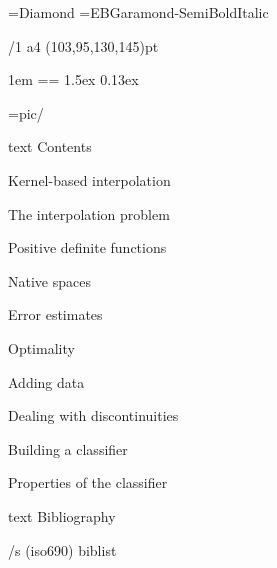 \useOpTeX  %


\hyperlinks \Black \Black
{}

\enlang
\fontfam[TypewriterMT]
\fontfam[BaskervilleMT]\let\semibold\relax \typosize[12.2/14.4]%



\font\symbols=Diamond %
\def\QED{\hbox{\symbols\resizethefont \,❖}}
\font\boldmathfont=EBGaramond-SemiBoldItalic
\famvardef\tt{\TypewriterMT{}\typoscale[870/]\rm}


\margins/1 a4 (103,95,130,145)pt


\parindent 1em
\iindent=\parindent \ttindent=\parindent
\parskip 1.5ex
 0.13ex

\picdir={pic/}

\bgroup
\let\_mtext\ignoreit
\nonum\notoc\chap Contents
\egroup
\tocpage

\chap Kernel-based interpolation

\sec The interpolation problem


\sec[positivesec] Positive definite functions


\sec Native spaces


\sec[errorsec] Error estimates


\sec Optimality


\sec[addingsec] Adding data


\chap Dealing with discontinuities

\sec[buildingsec] Building a classifier


\sec Properties of the classifier








\bgroup
\let\_mtext\ignoreit
\nonum\chap Bibliography

\def\_opwarning#1{}
\usebib/s (iso690) biblist
\egroup

\bye
